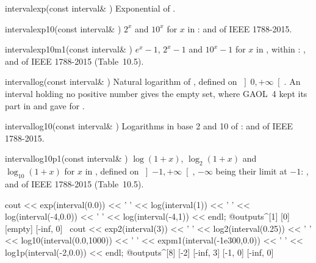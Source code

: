 \begin{deffun}{interval}{exp}{(const interval\& )}
  Exponential of .
\end{deffun}

\begin{deffun}{interval}{exp10}{(const interval\& )}
  $2^x$ and $10^x$ for $x$ in :  and  of IEEE
  1788-2015.\newinvfive
\end{deffun}

\begin{deffun}{interval}{exp10m1}{(const interval\& )}
  $e^x-1$, $2^x-1$ and $10^x-1$ for $x$ in , within
  : ,  and  of IEEE
  1788-2015 (Table~10.5).\newinvfive
\end{deffun}

\begin{deffun}{interval}{log}{(const interval\& )}
  Natural logarithm of , defined on $\left]0,+\infty\right[$. An
  interval holding no positive number gives the empty set, where GAOL~4 kept
  its part in  and gave  for
  .\newinvfive
\end{deffun}

\begin{deffun}{interval}{log10}{(const interval\& )}
  Logarithms in base 2 and 10 of :  and  of
  IEEE 1788-2015.\newinvfive
\end{deffun}

\begin{deffun}{interval}{log10p1}{(const interval\& )}
  $\log(1+x)$, $\log_2(1+x)$ and $\log_{10}(1+x)$ for $x$ in , defined
  on $\left]-1,+\infty\right[$, $-\infty$ being their limit at $-1$:
  ,  and  of IEEE 1788-2015
  (Table~10.5).\newinvfive
\begin{example}
cout << exp(interval(0.0)) << ' ' << log(interval(1)) << ' '
     << log(interval(-4,0.0)) << ' '
     << log(interval(-4,1)) << endl;
@outputs^[1] [0] [empty] [-inf, 0]~
cout << exp2(interval(3)) << ' ' << log2(interval(0.25)) << ' '
     << log10(interval(0.0,1000)) << ' '
     << expm1(interval(-1e300,0.0)) << ' '
     << log1p(interval(-2,0.0)) << endl;
@outputs^[8] [-2] [-inf, 3] [-1, 0] [-inf, 0]~
\end{example}
\end{deffun}


